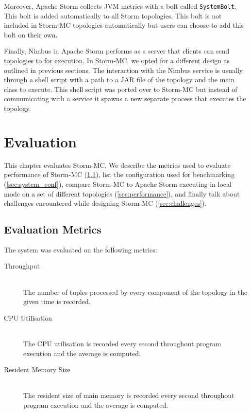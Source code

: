 \documentclass[bsc,logo,frontabs,twoside,singlespacing,normalheadings,parskip]{infthesis}\usepackage[]{graphicx}\usepackage[]{color}
\begin{document}
Moreover, Apache Storm collects JVM metrics with a bolt called \texttt{SystemBolt}. This bolt is added automatically to all Storm topologies. This bolt is not included in Storm-MC topologies automatically but users can choose to add this bolt on their own.

Finally, Nimbus in Apache Storm performs as a server that clients can send topologies to for execution. In Storm-MC, we opted for a different design as outlined in previous sections. The interaction with the Nimbus service is usually through a shell script with a path to a JAR file of the topology and the main class to execute. This shell script was ported over to Storm-MC but instead of communicating with a service it spawns a new separate process that executes the topology.

\clearpage{}

\clearpage{}\clearpage{}

\clearpage{}\chapter{Evaluation}

This chapter evaluates Storm-MC. We describe the metrics used to evaluate performance of Storm-MC (\ref{sec:metrics}), list the configuration used for benchmarking (\ref{sec:system_conf}), compare Storm-MC to Apache Storm executing in local mode on a set of different topologies (\ref{sec:performance}), and finally talk about challenges encountered while designing Storm-MC (\ref{sec:challenges}).

\section{Evaluation Metrics}
\label{sec:metrics}

The system was evaluated on the following metrics:

\begin{description}
	\item[Throughput] \hfill \\
	The number of tuples processed by every component of the topology in the given time is recorded.
	\item[CPU Utilisation] \hfill \\
	The CPU utilisation is recorded every second throughout program execution and the average is computed.
	\item[Resident Memory Size] \hfill \\
	The resident size of main memory is recorded every second throughout program execution and the average is computed.
\end{description}
\end{document}
